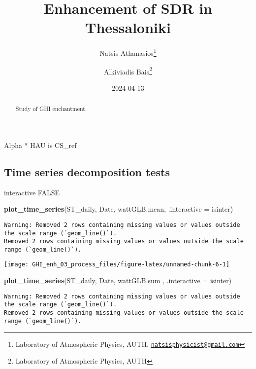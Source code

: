 \documentclass[
  10pt,
  a4paper,oneside]{article}
\title{Enhancement of SDR in Thessaloniki}
\author{Natsis Athanasios\footnote{Laboratory of Atmospheric Physics, AUTH, \href{mailto:natsisphysicist@gmail.com}{\nolinkurl{natsisphysicist@gmail.com}}} \and Alkiviadis Bais\footnote{Laboratory of Atmospheric Physics, AUTH}}
\date{2024-04-13}
\newenvironment{Shaded}{\begin{snugshade}}{\end{snugshade}}
\newcommand{\AttributeTok}[1]{\textcolor[rgb]{0.13,0.29,0.53}{#1}}
\newcommand{\FunctionTok}[1]{\textcolor[rgb]{0.13,0.29,0.53}{\textbf{#1}}}
\newcommand{\NormalTok}[1]{#1}
\begin{document}
\maketitle
\begin{abstract}
Study of GHI enchantment.
\end{abstract}

{
\hypersetup{linkcolor=}
\setcounter{tocdepth}{4}
\tableofcontents
}
Alpha * HAU is CS\_ref

\hypertarget{time-series-decomposition-tests}{%
\subsection{Time series decomposition tests}\label{time-series-decomposition-tests}}

interactive FALSE

\begin{Shaded}
\begin{Highlighting}[]
\FunctionTok{plot\_time\_series}\NormalTok{(ST\_daily, Date, wattGLB.mean, }\AttributeTok{.interactive =}\NormalTok{ isinter)}
\end{Highlighting}
\end{Shaded}

\begin{verbatim}
Warning: Removed 2 rows containing missing values or values outside the scale range (`geom_line()`).
Removed 2 rows containing missing values or values outside the scale range (`geom_line()`).
\end{verbatim}

\begin{center}\texttt{[image: GHI\_enh\_03\_process\_files/figure-latex/unnamed-chunk-6-1]} \end{center}

\begin{Shaded}
\begin{Highlighting}[]
\FunctionTok{plot\_time\_series}\NormalTok{(ST\_daily, Date, wattGLB.sum , }\AttributeTok{.interactive =}\NormalTok{ isinter)}
\end{Highlighting}
\end{Shaded}

\begin{verbatim}
Warning: Removed 2 rows containing missing values or values outside the scale range (`geom_line()`).
Removed 2 rows containing missing values or values outside the scale range (`geom_line()`).
\end{verbatim}
\end{document}
